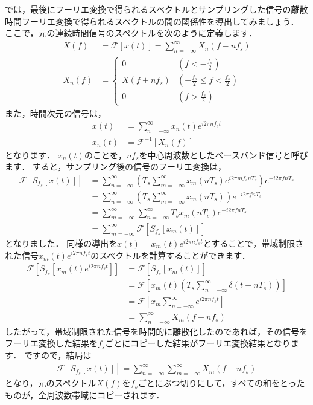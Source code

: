 では，最後にフーリエ変換で得られるスペクトルとサンプリングした信号の離散時間フーリエ変換で得られるスペクトルの間の関係性を導出してみましょう．
ここで，元の連続時間信号のスペクトルを次のように定義します．
\begin{align}
X(f) &= \mathcal{F}[x(t)] = \sum_{n=-\infty}^{\infty} X_n(f - nf_s) \\
X_n(f) &=   \begin{cases}
                0           & (f < -\frac{f_s}{2}) \\
                X(f + nf_s) & (-\frac{f_s}{2} \leq f < \frac{f_s}{2}) \\
                0           & (f > \frac{f_s}{2})
            \end{cases}
\end{align}
また，時間次元の信号は，
\begin{align}
x(t) &= \sum_{n=-\infty}^{\infty} x_n(t) e^{i2\pi nf_s t} \\
x_n(t) &=   \mathcal{F}^{-1}[X_n(f)]
\end{align}
となります．
$x_n(t)$のことを，$nf_s$を中心周波数としたベースバンド信号と呼びます．
すると，サンプリング後の信号のフーリエ変換は，
\begin{align}
\mathcal{F}[S_{f_s}[x(t)]] &= \sum_{n=-\infty}^{\infty} \left(T_s \sum_{m=-\infty}^{\infty} x_m(nT_s) e^{i2\pi mf_s n T_s} \right) e^{-i2\pi fnT_s} \nonumber\\
    &= \sum_{n=-\infty}^{\infty} \left(T_s \sum_{m=-\infty}^{\infty} x_m(nT_s) \right) e^{-i2\pi fnT_s} \nonumber\\
    &= \sum_{m=-\infty}^{\infty} \sum_{n=-\infty}^{\infty} T_s x_m(nT_s) e^{-i2\pi fnT_s} \nonumber\\
    &= \sum_{m=-\infty}^{\infty} \mathcal{F}[S_{f_s}[x_m(t)]]
\end{align}
となりました．
同様の導出を$x(t)=x_m(t)e^{i2\pi nf_s t}$とすることで，帯域制限された信号$x_m(t)e^{i2\pi nf_s t}$のスペクトルを計算することができます．
\begin{align}
\mathcal{F}[S_{f_s}[x_m(t)e^{i2\pi nf_s t}]] &= \mathcal{F}[S_{f_s}[x_m(t)]] \nonumber\\
    &= \mathcal{F}\left[x_m(t) \left(T_s \sum_{n=-\infty}^{\infty} \delta(t - nT_s) \right) \right] \nonumber\\
    &= \mathcal{F}\left[x_m \sum_{n=-\infty}^{\infty} e^{i2\pi n f_s t} \right] \nonumber\\
    &= \sum_{n=-\infty}^{\infty} X_m(f - nf_s)
\end{align}
したがって，帯域制限された信号を時間的に離散化したのであれば，その信号をフーリエ変換した結果を$f_s$ごとにコピーした結果がフーリエ変換結果となります．
ですので，結局は
\begin{align}
\mathcal{F}[S_{f_s}[x(t)]] = \sum_{n=-\infty}^{\infty} \sum_{m=-\infty}^{\infty} X_m(f - nf_s)
\end{align}
となり，元のスペクトル$X(f)$を$f_s$ごとにぶつ切りにして，すべての和をとったものが，全周波数帯域にコピーされます．

